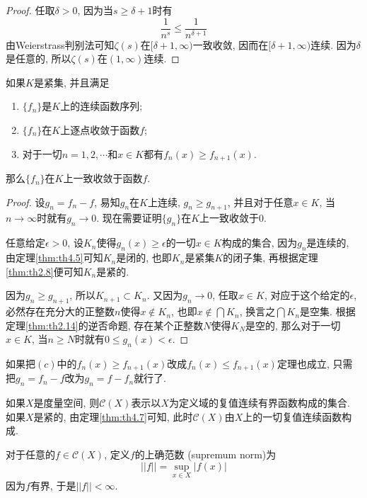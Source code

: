 \documentclass[cn,12pt,math=mtpro2,citestyle=gb7714-2015,bibstyle=gb7714-2015,twocol]{elegantbook}
\begin{document}
\begin{proof}
  任取$\delta>0$, 因为当$s\geq\delta+1$时有
  $$\frac{1}{n^s}\leq\frac{1}{n^{\delta+1}}$$
  由Weierstrass判别法可知$\zeta(s)$在$[\delta+1,\infty)$一致收敛, 因而在$[\delta+1,\infty)$连续. 因为$\delta$是任意的, 所以$\zeta(s)$在$(1,\infty)$连续.
\end{proof}
\begin{theorem}[Dini定理]
  如果$K$是紧集, 并且满足
  \begin{enumerate}[label=(\arabic*)]
  \item $\{f_n\}$是$K$上的连续函数序列;

  \item $\{f_n\}$在$K$上逐点收敛于函数$f$;

  \item 对于一切$n=1,2,\cdots$和$x\in K$都有$f_n(x)\geq f_{n+1}(x)$.
  \end{enumerate}
那么$\{f_n\}$在$K$上一致收敛于函数$f$.
\end{theorem}
\begin{proof}
  设$g_n=f_n-f$, 易知$g_n$在$K$上连续, $g_n\geq g_{n+1}$, 并且对于任意$x\in K$, 当$n\to\infty$时就有$g_n\to 0$. 现在需要证明$\{g_n\}$在$K$上一致收敛于$0$.

  任意给定$\epsilon>0$, 设$K_n$使得$g_n(x)\geq\epsilon$的一切$x\in K$构成的集合, 因为$g_n$是连续的, 由定理\ref{thm:th4.5}可知$K_n$是闭的, 也即$K_n$是紧集$K$的闭子集, 再根据定理\ref{thm:th2.8}便可知$K_n$是紧的.

  因为$g_n\geq g_{n+1}$, 所以$K_{n+1}\subset K_n$. 又因为$g_n\to 0$, 任取$x\in K$, 对应于这个给定的$\epsilon$, 必然存在充分大的正整数$n$使得$x \notin K_n$, 也即$x\notin \bigcap K_n$, 换言之$\bigcap K_n$是空集. 根据定理\ref{thm:th2.14}的逆否命题, 存在某个正整数$N$使得$K_N$是空的, 那么对于一切$x\in K$, 当$n\geq N$时就有$0\leq g_n(x)<\epsilon$.

\end{proof}
\begin{remark}
如果把$(c)$中的$f_n(x)\geq f_{n+1}(x)$改成$f_n(x)\leq f_{n+1}(x)$定理也成立, 只需把$g_n=f_n-f$改为$g_n=f-f_n$就行了.
\end{remark}

\begin{definition}
如果$X$是度量空间, 则$\mathscr{C}(X)$表示以$X$为定义域的复值连续有界函数构成的集合. 如果$X$是紧的, 由定理\ref{thm:th4.7}可知, 此时$\mathscr{C}(X)$由$X$上的一切复值连续函数构成.
\end{definition}
\begin{definition}
对于任意的$f\in\mathscr{C}(X)$, 定义$f$的上确范数 (supremum norm)为
$$||f||=\sup_{x\in X}|f(x)|$$
因为$f$有界, 于是$||f||<\infty$.
\end{definition}
\end{document}
